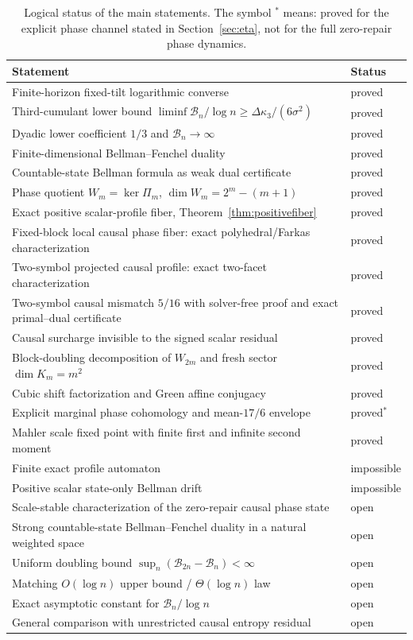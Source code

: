 \documentclass[11pt,a4paper]{article}
\theoremstyle{definition}
\theoremstyle{remark}
\newcommand{\cB}{\mathcal B}
\begin{document}
\begin{table}[ht]
\centering
\small
\begin{tabular}{p{}p{}}
\toprule
Statement & Status\\
\midrule
Finite-horizon fixed-tilt logarithmic converse & proved\\
Third-cumulant lower bound $\liminf\cB_n/\log n\ge\Delta\kappa_3/(6\sigma^2)$ & proved\\
Dyadic lower coefficient $1/3$ and $\cB_n\to\infty$ & proved\\
Finite-dimensional Bellman--Fenchel duality & proved\\
Countable-state Bellman formula as weak dual certificate & proved\\
Phase quotient $W_m=\ker\Pi_m$, $\dim W_m=2^m-(m+1)$ & proved\\
Exact positive scalar-profile fiber, Theorem~\ref{thm:positivefiber} & proved\\
Fixed-block local causal phase fiber: exact polyhedral/Farkas characterization & proved\\
Two-symbol projected causal profile: exact two-facet characterization & proved\\
Two-symbol causal mismatch $5/16$ with solver-free proof and exact primal--dual certificate & proved\\
Causal surcharge invisible to the signed scalar residual & proved\\
Block-doubling decomposition of $W_{2m}$ and fresh sector $\dim K_m=m^2$ & proved\\
Cubic shift factorization and Green affine conjugacy & proved\\
Explicit marginal phase cohomology and mean-$17/6$ envelope & proved$^*$\\
Mahler scale fixed point with finite first and infinite second moment & proved\\
Finite exact profile automaton & impossible\\
Positive scalar state-only Bellman drift & impossible\\
Scale-stable characterization of the zero-repair causal phase state & open\\
Strong countable-state Bellman--Fenchel duality in a natural weighted space & open\\
Uniform doubling bound $\sup_n(\cB_{2n}-\cB_n)<\infty$ & open\\
Matching $O(\log n)$ upper bound / $\Theta(\log n)$ law & open\\
Exact asymptotic constant for $\cB_n/\log n$ & open\\
General comparison with unrestricted causal entropy residual & open\\
\bottomrule
\end{tabular}
\caption{Logical status of the main statements. The symbol $^*$ means: proved for the explicit phase channel stated in Section~\ref{sec:eta}, not for the full zero-repair phase dynamics.}
\label{tab:ledger}
\end{table}
\end{document}
